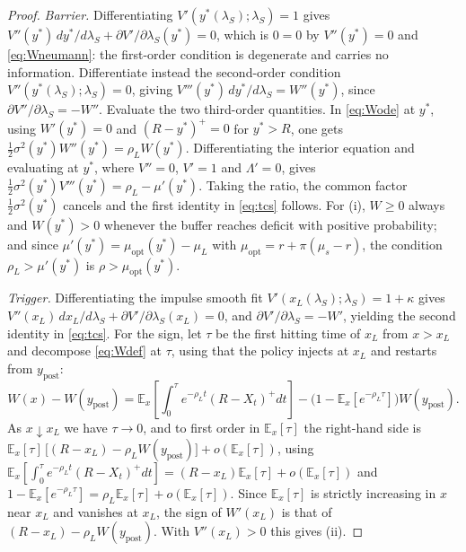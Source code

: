 \documentclass[11pt]{article}
\theoremstyle{remark}
\begin{document}
\begin{proof}
\emph{Barrier.} Differentiating $V'(y^*(\lambda_S);\lambda_S)=1$ gives
$V''(y^*)\,dy^*/d\lambda_S + \partial V'/\partial\lambda_S(y^*) = 0$,
which is $0=0$ by $V''(y^*)=0$ and \eqref{eq:Wneumann}: the first-order
condition is degenerate and carries no information. Differentiate instead
the second-order condition $V''(y^*(\lambda_S);\lambda_S)=0$, giving
$V'''(y^*)\,dy^*/d\lambda_S = W''(y^*)$, since
$\partial V''/\partial\lambda_S = -W''$. Evaluate the two third-order
quantities. In \eqref{eq:Wode} at $y^*$, using $W'(y^*)=0$ and
$(R-y^*)^+=0$ for $y^*>R$, one gets
$\tfrac12\sigma^2(y^*)W''(y^*) = \rho_L W(y^*)$. Differentiating the
interior equation and evaluating at $y^*$, where $V''=0$, $V'=1$ and
$\Lambda'=0$, gives
$\tfrac12\sigma^2(y^*)V'''(y^*) = \rho_L - \mu'(y^*)$. Taking the ratio,
the common factor $\tfrac12\sigma^2(y^*)$ cancels and the first identity
in \eqref{eq:tcs} follows. For (i), $W\ge0$ always and $W(y^*)>0$ whenever
the buffer reaches deficit with positive probability; and since
$\mu'(y^*) = \mu_{\mathrm{opt}}(y^*) - \mu_L$ with
$\mu_{\mathrm{opt}} = r + \pi(\mu_s-r)$, the condition
$\rho_L > \mu'(y^*)$ is $\rho > \mu_{\mathrm{opt}}(y^*)$.

\emph{Trigger.} Differentiating the impulse smooth fit
$V'(x_L(\lambda_S);\lambda_S) = 1+\kappa$ gives
$V''(x_L)\,dx_L/d\lambda_S + \partial V'/\partial\lambda_S(x_L) = 0$,
and $\partial V'/\partial\lambda_S = -W'$, yielding the second identity in
\eqref{eq:tcs}. For the sign, let $\tau$ be the first hitting time of
$x_L$ from $x>x_L$ and decompose \eqref{eq:Wdef} at $\tau$, using that the
policy injects at $x_L$ and restarts from $y_{\mathrm{post}}$:
\[
W(x) - W(y_{\mathrm{post}})
= \mathbb{E}_x\!\left[\int_0^\tau e^{-\rho_L t}(R-X_t)^+dt\right]
  - \big(1-\mathbb{E}_x[e^{-\rho_L\tau}]\big)W(y_{\mathrm{post}}).
\]
As $x \downarrow x_L$ we have $\tau \to 0$, and to first order in
$\mathbb{E}_x[\tau]$ the right-hand side is
$\mathbb{E}_x[\tau]\,\big[(R-x_L) - \rho_L W(y_{\mathrm{post}})\big] + o(\mathbb{E}_x[\tau])$,
using $\mathbb{E}_x[\int_0^\tau e^{-\rho_L t}(R-X_t)^+dt] = (R-x_L)\mathbb{E}_x[\tau] + o(\mathbb{E}_x[\tau])$
and $1-\mathbb{E}_x[e^{-\rho_L\tau}] = \rho_L\mathbb{E}_x[\tau] + o(\mathbb{E}_x[\tau])$.
Since $\mathbb{E}_x[\tau]$ is strictly increasing in $x$ near $x_L$ and
vanishes at $x_L$, the sign of $W'(x_L)$ is that of
$(R-x_L) - \rho_L W(y_{\mathrm{post}})$. With $V''(x_L)>0$ this gives (ii).
\end{proof}
\end{document}
